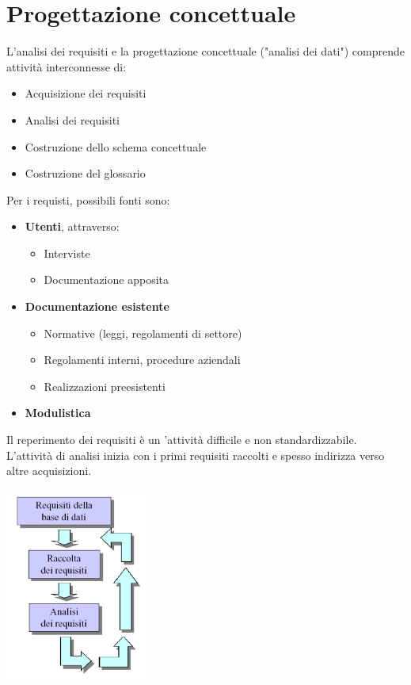 \documentclass[12pt]{article}
\begin{document}
\section{Progettazione concettuale}
L'analisi dei requisiti e la progettazione concettuale ("analisi dei dati") comprende attività interconnesse di:
\begin{itemize}
    \item Acquisizione dei requisiti
    \item Analisi dei requisiti
    \item Costruzione dello schema concettuale
    \item Costruzione del glossario
\end{itemize}
Per i requisti, possibili fonti sono:
\begin{itemize}
    \item \textbf{Utenti}, attraverso:
    \begin{itemize}
        \item Interviste
        \item Documentazione apposita
    \end{itemize}
    \item \textbf{Documentazione esistente}
    \begin{itemize}
        \item Normative (leggi, regolamenti di settore)
        \item Regolamenti interni, procedure aziendali
        \item Realizzazioni preesistenti
    \end{itemize}
    \item \textbf{Modulistica}
\end{itemize}
Il reperimento dei requisiti è un 'attività difficile e non standardizzabile. L'attività di analisi inizia con i primi requisiti raccolti e spesso indirizza verso altre acquisizioni.
\begin{center}
    \includegraphics[width = 0.35\textwidth]{Images/44.PNG}
\end{center}
\end{document}
